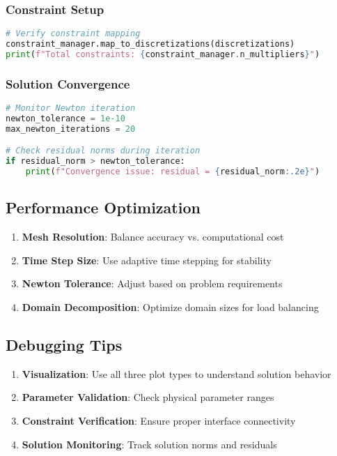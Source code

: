 \documentclass[11pt,a4paper]{article}
\begin{document}
\subsubsection{Constraint Setup}
\begin{lstlisting}[language=Python, caption={Constraint Verification}]
# Verify constraint mapping
constraint_manager.map_to_discretizations(discretizations)
print(f"Total constraints: {constraint_manager.n_multipliers}")
\end{lstlisting}

\subsubsection{Solution Convergence}
\begin{lstlisting}[language=Python, caption={Convergence Monitoring}]
# Monitor Newton iteration
newton_tolerance = 1e-10
max_newton_iterations = 20

# Check residual norms during iteration
if residual_norm > newton_tolerance:
    print(f"Convergence issue: residual = {residual_norm:.2e}")
\end{lstlisting}

\subsection{Performance Optimization}

\begin{enumerate}
    \item \textbf{Mesh Resolution}: Balance accuracy vs. computational cost
    \item \textbf{Time Step Size}: Use adaptive time stepping for stability
    \item \textbf{Newton Tolerance}: Adjust based on problem requirements
    \item \textbf{Domain Decomposition}: Optimize domain sizes for load balancing
\end{enumerate}

\subsection{Debugging Tips}

\begin{enumerate}
    \item \textbf{Visualization}: Use all three plot types to understand solution behavior
    \item \textbf{Parameter Validation}: Check physical parameter ranges
    \item \textbf{Constraint Verification}: Ensure proper interface connectivity
    \item \textbf{Solution Monitoring}: Track solution norms and residuals
\end{enumerate}
\end{document}
